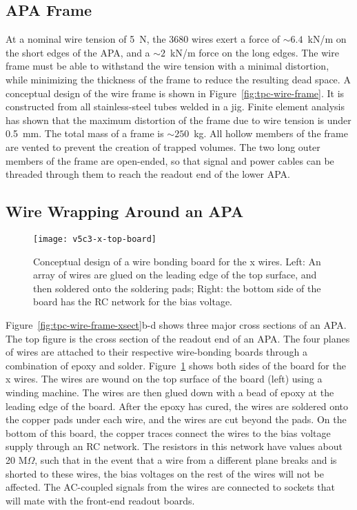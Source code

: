 \subsection{APA Frame}

At a nominal wire tension of 5~N, the 3680 wires exert a force of 
$\sim 6.4$~kN/m on the short edges of the APA, and a 
$\sim 2 $~kN/m force on the long edges. The wire 
frame must be able to withstand the wire tension with a minimal 
distortion, while minimizing the thickness of the 
frame to reduce the resulting dead space. A conceptual design 
of the wire frame is shown in Figure~\ref{fig:tpc-wire-frame}.  
It is constructed from all stainless-steel tubes welded in a jig.  Finite element analysis has shown that the maximum distortion of the frame due to wire tension is under 0.5~mm.
The total mass of a frame is $\sim 250$~kg.  All hollow members 
of the frame are vented to prevent the creation of trapped volumes.
The two long outer members of the frame are open-ended, so that signal 
and power cables can be threaded through them to reach the readout 
end of the lower APA.  

\subsection{Wire Wrapping Around an APA}


\begin{figure}[htpb]
\centering
\texttt{[image: v5c3-x-top-board]}
\caption[Conceptual design of a wire bonding board for the x wires]{Conceptual design of a wire bonding board for the x wires. Left: An array of wires are glued on the leading edge of the top surface, and then soldered onto the soldering pads; Right: the bottom side of the board has the RC network for the bias voltage. }
\label{fig:tpc-wire-board-x}
\end{figure}


Figure~\ref{fig:tpc-wire-frame-xsect}b-d shows three major cross sections of an APA.  The top figure is the cross section of the readout end of an 
APA.  The four planes of wires are attached to their respective 
wire-bonding boards through a combination of epoxy and solder.
Figure~\ref{fig:tpc-wire-board-x} shows both sides of the board for the x wires.  
The wires are wound on the top surface of the board (left) using a winding machine.  The wires are then glued down with a bead of epoxy at the leading edge of the board.  After the epoxy has cured, the wires are soldered onto the copper pads under each wire, and the wires are cut beyond the pads.  On the bottom of this board, the copper traces connect the wires to the bias voltage supply through an RC network.  The resistors in this network have values about 20 M$\Omega$, such that in the event that a wire from a different plane breaks and is shorted to these wires, the bias voltages on the rest of the wires will not be affected. The AC-coupled signals from the wires are connected to sockets that will mate with the front-end readout boards.


